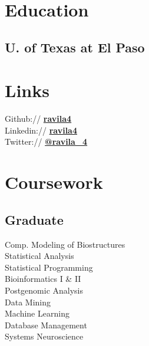 \documentclass[]{deedy-resume-openfont}
\begin{document}
\lastupdated


\begin{minipage}[t]{0.33\textwidth} 


\section{Education} 

\subsection{U. of Texas at El Paso}
\sectionsep

\sectionsep


\section{Links} 
Github:// \href{https://github.com/ravila4}{\bf ravila4}\\
Linkedin:// \href{https://www.linkedin.com/in/ravila4/}{\bf ravila4}\\
Twitter://  \href{https://twitter.com/ravila_4}{\bf @ravila\_4}\\
\sectionsep


\section{Coursework}
\subsection{Graduate}
Comp. Modeling of Biostructures\\
Statistical Analysis \\
Statistical Programming \\
Bioinformatics I \& II \\
Postgenomic Analysis\\
Data Mining \\
Machine Learning \\
Database Management\\
Systems Neuroscience\\
\sectionsep


\end{minipage}
\end{document}
